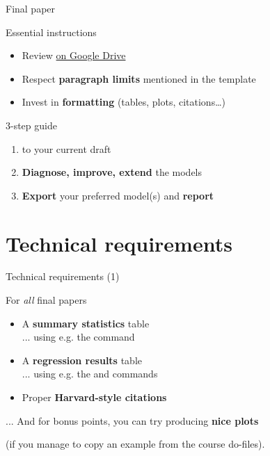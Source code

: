 \documentclass[t]{beamer}
\begin{document}
	\begin{frame}[t]{Final paper}

		\begin{block}{Essential instructions}

			\begin{itemize}
				\item Review  \href{https://docs.google.com/document/d/1s-lZWDen7RWPcsIdJoxIDa8Q7V-AGisz61Hg1bQpq8c/edit}{on Google Drive}%
				\item Respect \textbf{paragraph limits} mentioned in the template
				\item Invest in \textbf{formatting} (tables, plots, citations…)
			\end{itemize}
			
		\end{block}

		\begin{block}{3-step guide}

			\begin{enumerate}
				\item \textbf{} to your current draft
				\item \textbf{Diagnose, improve, extend} the models
				\item \textbf{Export} your preferred model(s) and \textbf{report}
			\end{enumerate}

		\end{block}
					
	\end{frame}

	\section{Technical requirements}

	\begin{frame}[t]{Technical requirements (1)}

		\begin{alertblock}{For \emph{all} final papers}

			\begin{itemize}
				\item A \textbf{summary statistics} table\\
        ... using e.g. the  command
				\item A \textbf{regression results} table\\
        ... using e.g. the  and  commands
				\item Proper \textbf{Harvard-style citations}
			\end{itemize}
			
		\end{alertblock}

		... And for bonus points, you can try producing \textbf{nice plots}
    
    (if you manage to copy an example from the course do-files).%
					
	\end{frame}
\end{document}
